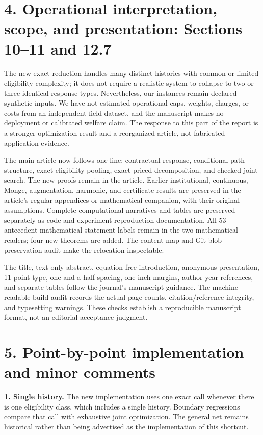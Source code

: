\documentclass[11pt,letterpaper]{article}
\begin{document}
\section*{4. Operational interpretation, scope, and presentation: Sections 10–11 and 12.7}


The new exact reduction handles many distinct histories with common or limited eligibility complexity; it does not require a realistic system to collapse to two or three identical response types. Nevertheless, our instances remain declared synthetic inputs. We have not estimated operational caps, weights, charges, or costs from an independent field dataset, and the manuscript makes no deployment or calibrated welfare claim. The response to this part of the report is a stronger optimization result and a reorganized article, not fabricated application evidence.



The main article now follows one line: contractual response, conditional path structure, exact eligibility pooling, exact priced decomposition, and checked joint search. The new proofs remain in the article. Earlier institutional, continuous, Monge, augmentation, harmonic, and certificate results are preserved in the article's regular appendices or mathematical companion, with their original assumptions. Complete computational narratives and tables are preserved separately as code-and-experiment reproduction documentation. All 53 antecedent mathematical statement labels remain in the two mathematical readers; four new theorems are added. The content map and Git-blob preservation audit make the relocation inspectable.



The title, text-only abstract, equation-free introduction, anonymous presentation, 11-point type, one-and-a-half spacing, one-inch margins, author-year references, and separate tables follow the journal's manuscript guidance. The machine-readable build audit records the actual page counts, citation/reference integrity, and typesetting warnings. These checks establish a reproducible manuscript format, not an editorial acceptance judgment.



\section*{5. Point-by-point implementation and minor comments}


\textbf{1. Single history.} The new implementation uses one exact call whenever there is one eligibility class, which includes a single history. Boundary regressions compare that call with exhaustive joint optimization. The general net remains historical rather than being advertised as the implementation of this shortcut.
\end{document}
